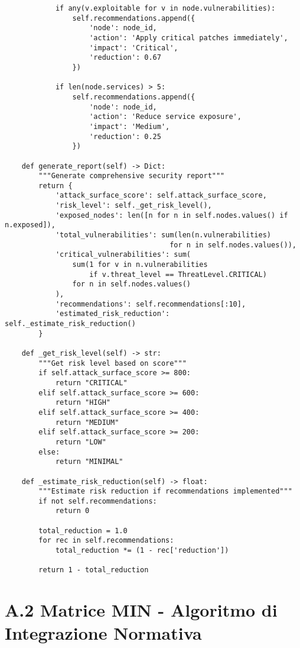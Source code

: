 \begin{verbatim}
            if any(v.exploitable for v in node.vulnerabilities):
                self.recommendations.append({
                    'node': node_id,
                    'action': 'Apply critical patches immediately',
                    'impact': 'Critical',
                    'reduction': 0.67
                })
            
            if len(node.services) > 5:
                self.recommendations.append({
                    'node': node_id,
                    'action': 'Reduce service exposure',
                    'impact': 'Medium',
                    'reduction': 0.25
                })
    
    def generate_report(self) -> Dict:
        """Generate comprehensive security report"""
        return {
            'attack_surface_score': self.attack_surface_score,
            'risk_level': self._get_risk_level(),
            'exposed_nodes': len([n for n in self.nodes.values() if n.exposed]),
            'total_vulnerabilities': sum(len(n.vulnerabilities) 
                                       for n in self.nodes.values()),
            'critical_vulnerabilities': sum(
                sum(1 for v in n.vulnerabilities 
                    if v.threat_level == ThreatLevel.CRITICAL)
                for n in self.nodes.values()
            ),
            'recommendations': self.recommendations[:10],
            'estimated_risk_reduction': self._estimate_risk_reduction()
        }
    
    def _get_risk_level(self) -> str:
        """Get risk level based on score"""
        if self.attack_surface_score >= 800:
            return "CRITICAL"
        elif self.attack_surface_score >= 600:
            return "HIGH"
        elif self.attack_surface_score >= 400:
            return "MEDIUM"
        elif self.attack_surface_score >= 200:
            return "LOW"
        else:
            return "MINIMAL"
    
    def _estimate_risk_reduction(self) -> float:
        """Estimate risk reduction if recommendations implemented"""
        if not self.recommendations:
            return 0
        
        total_reduction = 1.0
        for rec in self.recommendations:
            total_reduction *= (1 - rec['reduction'])
        
        return 1 - total_reduction
\end{verbatim}

\section{A.2 Matrice MIN - Algoritmo di Integrazione Normativa}
\label{sec:min-algorithm}

